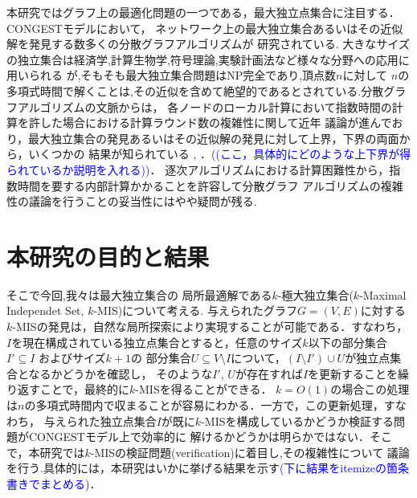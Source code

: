 \documentclass[12pt]{thesis}
\newcommand{\Izumi}[1]{\textcolor{blue}{(#1)}}
\newcommand{\CONGEST}{\textsf{CONGEST}}
\theoremstyle{definition}
\begin{document}
本研究ではグラフ上の最適化問題の一つである，最大独立点集合に注目する．{\CONGEST}モデルにおいて，
ネットワーク上の最大独立集合あるいはその近似解を発見する数多くの分散グラフアルゴリズムが
研究されている.
大きなサイズの独立集合は経済学,計算生物学,符号理論,実験計画法など様々な分野への応用に用いられる \cite{kawarabayashi2019improved} が,そもそも最大独立集合問題はNP完全であり,頂点数$n$に対して
$n$の多項式時間で解くことは,その近似を含めて絶望的であるとされている.分散グラフアルゴリズムの文脈からは，
各ノードのローカル計算において指数時間の計算を許した場合における計算ラウンド数の複雑性に関して近年
議論が進んでおり，最大独立集合の発見あるいはその近似解の発見に対して上界，下界の両面から，いくつかの
結果が知られている \cite{kawarabayashi2019improved},  \cite{efron2020beyond}．(\Izumi{ここ，具体的にどのような上下界が得られているか説明を入れる})．
逐次アルゴリズムにおける計算困難性から，指数時間を要する内部計算かかることを許容して分散グラフ
アルゴリズムの複雑性の議論を行うことの妥当性にはやや疑問が残る.

\section{本研究の目的と結果}

そこで今回,我々は最大独立集合の
局所最適解である$k$-極大独立集合($k$-Maximal Independet Set, $k$-MIS)について考える.
与えられたグラフ$G=(V, E)$に対する$k$-MISの発見は，自然な局所探索により実現することが可能である．すなわち，
$I$を現在構成されている独立点集合とすると，任意のサイズ$k$以下の部分集合$I' \subseteq I$ およびサイズ$k+1$の
部分集合$U \subseteq V\setminus I$について，$(I \setminus I') \cup U$が独立点集合となるかどうかを確認し，
そのような$I'$, $U$が存在すれば$I$を更新することを繰り返すことで，最終的に$k$-MISを得ることができる．
$k = O(1)$の場合この処理は$n$の多項式時間内で収まることが容易にわかる．一方で，この更新処理，すなわち，
与えられた独立点集合$I$が既に$k$-MISを構成しているかどうか検証する問題が{\CONGEST}モデル上で効率的に
解けるかどうかは明らかではない．そこで，本研究では$k$-MISの検証問題(verification)に着目し,その複雑性について
議論を行う.具体的には，本研究はいかに挙げる結果を示す\Izumi{下に結果をitemizeの箇条書きでまとめる}．
\end{document}
